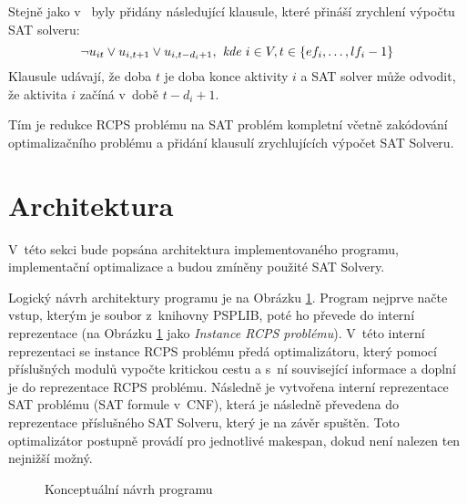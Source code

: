 \documentclass[a4paper, 12pt]{article}
\begin{document}
Stejně jako v~\cite{horbach:10} byly přidány následující klausule, které přináší zrychlení výpočtu SAT solveru:
\begin{equation}
\label{eq:6}
   \neg u_{it} \vee u_{i,t+1} \vee u_{i,t-d_i+1},\emph{ kde } i\in V, t\in\{ef_i,\ldots,lf_i-1\}  
\end{equation}
Klausule udávají, že doba $t$ je doba konce aktivity $i$ a SAT solver může odvodit, že aktivita $i$ začíná v~době
$t-d_i+1$.

Tím je redukce RCPS problému na SAT problém kompletní včetně zakódování optimalizačního problému a přidání
klausulí zrychlujících výpočet SAT Solveru.

\section{Architektura}
\label{sec:arch}
V~této sekci bude popsána architektura implementovaného programu, implementační optimalizace a budou zmíněny použité SAT Solvery.

Logický návrh architektury programu je na Obrázku \ref{fig:arch}.
Program nejprve načte vstup, kterým je soubor z~knihovny PSPLIB, poté ho
převede do interní reprezentace (na Obrázku \ref{fig:arch} jako \emph{Instance RCPS problému}).
V~této interní reprezentaci se instance RCPS problému předá optimalizátoru,
který pomocí příslušných modulů vypočte kritickou cestu a s~ní související informace a doplní je do reprezentace RCPS problému.
Následně je vytvořena interní reprezentace SAT problému (SAT formule v~CNF), která je následně
převedena do reprezentace příslušného SAT Solveru, který je na závěr spuštěn.
Toto optimalizátor postupně provádí pro jednotlivé makespan, dokud není nalezen ten nejnižší možný.
\begin{figure}
\begin{center}
    
    \caption{Konceptuální návrh programu}
    \label{fig:arch}
\end{center}
\end{figure}
\end{document}
